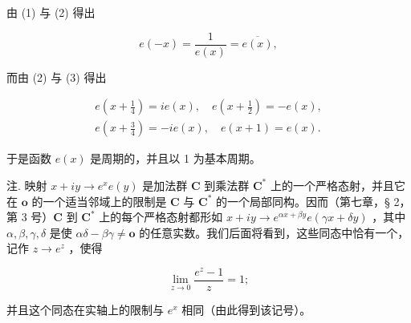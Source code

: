 由 (1) 与 (2) 得出

\[
e (- x) = \frac {1}{e (x)} = \overline {{{{e (x)}}}},\tag{4}
\]

而由 (2) 与 (3) 得出

\[
\begin{array}{l} e (x + \frac {1}{4}) = i e (x), \quad e (x + \frac {1}{2}) = - e (x), \\ e (x + \frac {3}{4}) = - i e (x), \quad e (x + 1) = e (x). \end{array}
\]

于是函数 \(e(x)\) 是周期的，并且以 1 为基本周期。

注. 映射 \(x + iy \to e^x e(y)\) 是加法群 \(\mathbf{C}\) 到乘法群 \(\mathbf{C}^*\) 上的一个严格态射，并且它在 \(\mathbf{o}\) 的一个适当邻域上的限制是 \(\mathbf{C}\) 与 \(\mathbf{C}^*\) 的一个局部同构。因而（第七章，§ 2，第 3 号）\(\mathbf{C}\) 到 \(\mathbf{C}^*\) 上的每个严格态射都形如 \(x + iy \to e^{\alpha x + \beta y} e(\gamma x + \delta y)\) ，其中 \(\alpha, \beta, \gamma, \delta\) 是使 \(\alpha \delta - \beta \gamma \neq \mathbf{o}\) 的任意实数。我们后面将看到，这些同态中恰有一个，记作 \(z \rightarrow e^{z}\) ，使得

\[
\lim _ {z \rightarrow 0} \frac {e ^ {z} - 1}{z} = 1;
\]

并且这个同态在实轴上的限制与 \(e^{x}\) 相同（由此得到该记号）。

